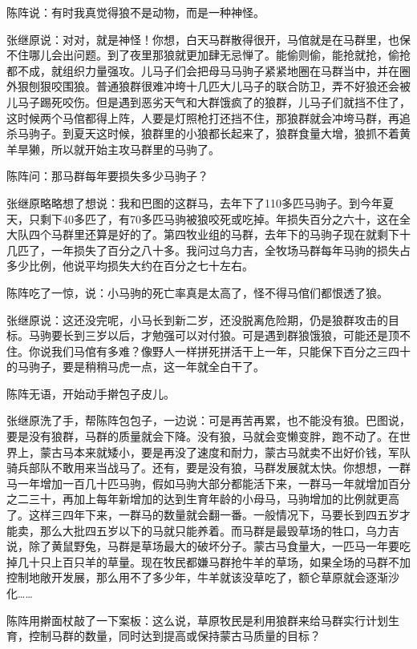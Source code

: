 \par 陈阵说：有时我真觉得狼不是动物，而是一种神怪。
\par 张继原说：对对，就是神怪！你想，白天马群散得很开，马倌就是在马群里，也保不住哪儿会出问题。到了夜里那狼就更加肆无忌惮了。能偷则偷，能抢就抢，偷抢都不成，就组织力量强攻。儿马子们会把母马马驹子紧紧地圈在马群当中，并在圈外狠刨狠咬围狼。普通狼群很难冲垮十几匹大儿马子的联合防卫，弄不好狼还会被儿马子踢死咬伤。但是遇到恶劣天气和大群饿疯了的狼群，儿马子们就挡不住了，这时候两个马倌都得上阵，人要是灯照枪打还挡不住，那狼群就会冲垮马群，再追杀马驹子。到夏天这时候，狼群里的小狼都长起来了，狼群食量大增，狼抓不着黄羊旱獭，所以就开始主攻马群里的马驹了。
\par 陈阵问：那马群每年要损失多少马驹子？
\par 张继原略略想了想说：我和巴图的这群马，去年下了110多匹马驹子。到今年夏天，只剩下40多匹了，有70多匹马驹被狼咬死或吃掉。年损失百分之六十，这在全大队四个马群里还算是好的了。第四牧业组的马群，去年下的马驹子现在就剩下十几匹了，一年损失了百分之八十多。我问过乌力吉，全牧场马群每年马驹的损失占多少比例，他说平均损失大约在百分之七十左右。
\par 陈阵吃了一惊，说：小马驹的死亡率真是太高了，怪不得马倌们都恨透了狼。
\par 张继原说：这还没完呢，小马长到新二岁，还没脱离危险期，仍是狼群攻击的目标。马驹要长到三岁以后，才勉强可以对付狼。可是遇到群狼饿狼，可能还是顶不住。你说我们马倌有多难？像野人一样拼死拼活干上一年，只能保下百分之三四十的马驹子，要是稍稍马虎一点，这一年就全白干了。
\par 陈阵无语，开始动手擀包子皮儿。
\par 张继原洗了手，帮陈阵包包子，一边说：可是再苦再累，也不能没有狼。巴图说，要是没有狼群，马群的质量就会下降。没有狼，马就会变懒变胖，跑不动了。在世界上，蒙古马本来就矮小，要是再没了速度和耐力，蒙古马就卖不出好价钱，军队骑兵部队不敢用来当战马了。还有，要是没有狼，马群发展就太快。你想想，一群马一年增加一百几十匹马驹，假如马驹大部分都能活下来，一群马一年就增加百分之二三十，再加上每年新增加的达到生育年龄的小母马，马驹增加的比例就更高了。这样三四年下来，一群马的数量就会翻一番。一般情况下，马要长到四五岁才能卖，那么大批四五岁以下的马就只能养着。而马群是最毁草场的牲口，乌力吉说，除了黄鼠野兔，马群是草场最大的破坏分子。蒙古马食量大，一匹马一年要吃掉几十只上百只羊的草量。现在牧民都嫌马群抢牛羊的草场，如果全场的马群不加控制地敞开发展，那么用不了多少年，牛羊就该没草吃了，额仑草原就会逐渐沙化……
\par 陈阵用擀面杖敲了一下案板：这么说，草原牧民是利用狼群来给马群实行计划生育，控制马群的数量，同时达到提高或保持蒙古马质量的目标？
